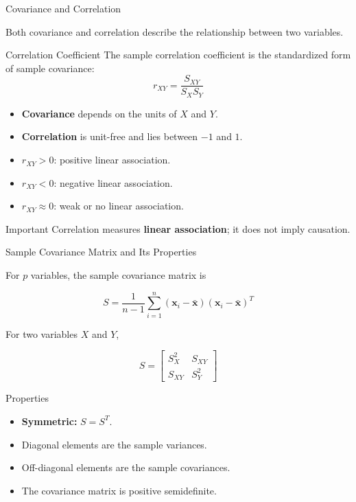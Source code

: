 \documentclass{beamer}
\begin{document}
\begin{frame}{Covariance and Correlation}

Both covariance and correlation describe the relationship
between two variables.

\begin{block}{Correlation Coefficient}
The sample correlation coefficient is the standardized form
of sample covariance:
\[
\boxed{
r_{XY}
=
\frac{S_{XY}}{S_XS_Y}
}
\]
\end{block}

\begin{itemize}
    \item \textbf{Covariance} depends on the units of $X$ and $Y$.
    \item \textbf{Correlation} is unit-free and lies between $-1$ and $1$.
    \item $r_{XY}>0$: positive linear association.
    \item $r_{XY}<0$: negative linear association.
    \item $r_{XY}\approx0$: weak or no linear association.
\end{itemize}

\begin{block}{Important}
Correlation measures \textbf{linear association}; it does not imply
causation.
\end{block}

\end{frame}


\begin{frame}{Sample Covariance Matrix and Its Properties}

For $p$ variables, the sample covariance matrix is

\[
\boxed{
S=
\frac{1}{n-1}
\sum_{i=1}^{n}
(\mathbf{x}_i-\bar{\mathbf{x}})
(\mathbf{x}_i-\bar{\mathbf{x}})^T
}
\]

For two variables $X$ and $Y$,

\[
\boxed{
S=
\begin{bmatrix}
S_X^2 & S_{XY}\\
S_{XY} & S_Y^2
\end{bmatrix}
}
\]

\begin{block}{Properties}
\begin{itemize}
    \item \textbf{Symmetric:} $S=S^T$.
    \item Diagonal elements are the sample variances.
    \item Off-diagonal elements are the sample covariances.
    \item The covariance matrix is positive semidefinite.
\end{itemize}
\end{block}

\end{frame}
\end{document}
